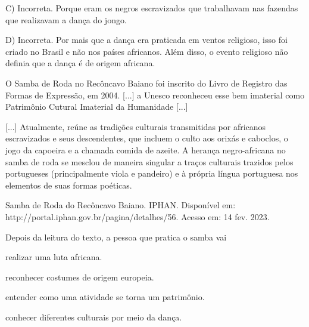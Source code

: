 {{{{{{{{{{{{{{{{{C) Incorreta. Porque eram os negros escravizados que trabalhavam nas
fazendas que realizavam a dança do jongo.

D) Incorreta. Por mais que a dança era praticada em ventos religioso,
isso foi criado no Brasil e não nos países africanos. Além disso, o
evento religioso não definia que a dança é de origem africana.}

\num{}
  O Samba de Roda no Recôncavo Baiano foi inscrito do Livro de Registro
  das Formas de Expressão, em 2004. {[}...{]} a Unesco reconheceu esse
  bem imaterial como Patrimônio Cutural Imaterial da Humanidade
  {[}...{]}

{[}...{]} Atualmente, reúne as tradições culturais transmitidas por
africanos escravizados e seus descendentes, que incluem o culto aos
orixás e caboclos, o jogo da capoeira e a chamada comida de azeite. A
herança negro-africana no samba de roda se mesclou de maneira singular a
traços culturais trazidos pelos portugueses (principalmente viola e
pandeiro) e à própria língua portuguesa nos elementos de suas formas
poéticas.~

Samba de Roda do Recôncavo Baiano. IPHAN. Disponível em:
http://portal.iphan.gov.br/pagina/detalhes/56. Acesso em: 14 fev. 2023.

Depois da leitura do texto, a pessoa que pratica o samba vai

\begin{escolha}
\item realizar uma luta africana.

\item reconhecer costumes de origem europeia.

\item entender como uma atividade se torna um patrimônio.

\item conhecer diferentes culturais por meio da dança.
\end{escolha}

}}}}}}}}}}}}}}}}
